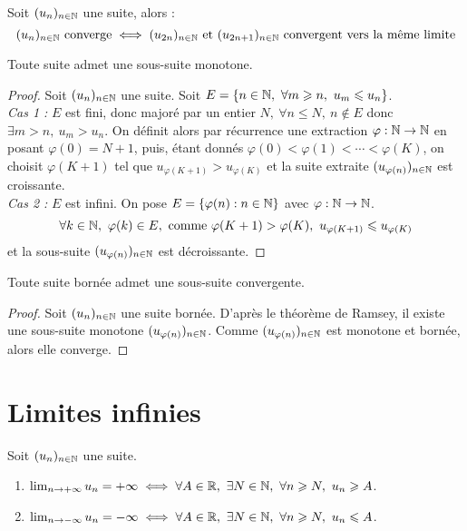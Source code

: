 \begin{proposition}
    Soit $(u_n)_{n \in \mathbb{N}}$ une suite, alors :
    \[ (u_n)_{n \in \mathbb{N}} \text{ converge} \iff (u_{2n})_{n \in \mathbb{N}} \text{ et } (u_{2n + 1})_{n \in \mathbb{N}} \text{ convergent vers la même limite} \]
\end{proposition}

\begin{theorem}
    Toute suite admet une sous-suite monotone.
\end{theorem}

\begin{proof}
    Soit $(u_n)_{n \in \mathbb{N}}$ une suite. Soit $E = \{ n \in \N,\ \forall m \geq n,\ u_m \leq u_n \}$.
    \\ 
    \emph{Cas 1 :} $E$ est fini, donc majoré par un entier $N,\ \forall n \leq N,\ n \notin E$ donc $\exists m > n,\ u_m > u_n$. On définit alors par récurrence une extraction $\varphi : \mathbb{N} \to \mathbb{N}$ en posant $\varphi(0) = N + 1$, puis, étant donnés $\varphi(0) < \varphi(1) < \cdots < \varphi(K)$, on choisit $\varphi(K + 1)$ tel que $u_{\varphi(K+1)} > u_{\varphi(K)}$ et la suite extraite $(u_{\varphi(n)})_{n \in \mathbb{N}}$ est croissante.
    \\ 
    \emph{Cas 2 :} $E$ est infini. On pose $E = \{ \varphi(n) : n \in \mathbb{N} \}$ avec $\varphi : \mathbb{N} \to \mathbb{N}$.
    \[ \forall k \in \mathbb{N},\ \varphi(k) \in E, \text{ comme } \varphi(K + 1) > \varphi(K),\ u_{\varphi(K+1)} \leqslant u_{\varphi(K)} \]
    et la sous-suite $(u_{\varphi(n)})_{n \in \mathbb{N}}$ est décroissante.
\end{proof}

\begin{theorem}
    Toute suite bornée admet une sous-suite convergente.
\end{theorem}

\begin{proof}
    Soit $(u_n)_{n \in \mathbb{N}}$ une suite bornée. D'après le théorème de Ramsey, il existe une sous-suite monotone $(u_{\varphi(n)})_{n \in \mathbb{N}}$. Comme $(u_{\varphi(n)})_{n \in \mathbb{N}}$ est monotone et bornée, alors elle converge.
\end{proof}

\section{Limites infinies}

\begin{definition}
    Soit $(u_n)_{n \in \mathbb{N}}$ une suite.
    \begin{enumerate}
        \item $\lim_{n \to +\infty} u_n = +\infty \iff \forall A \in \mathbb{R},\ \exists N \in \mathbb{N},\ \forall n \geqslant N,\ u_n \geqslant A$.
        \item $\lim_{n \to -\infty} u_n = -\infty \iff \forall A \in \mathbb{R},\ \exists N \in \mathbb{N},\ \forall n \geqslant N,\ u_n \leqslant A$.
    \end{enumerate}
\end{definition}

